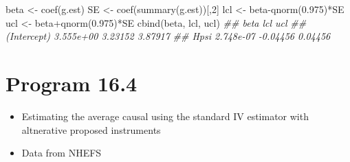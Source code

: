 \documentclass[
  10pt,
  a4paper,
]{book}
\newenvironment{Shaded}{\begin{snugshade}}{\end{snugshade}}
\newcommand{\DecValTok}[1]{\textcolor[rgb]{0.68,0.00,0.00}{#1}}
\newcommand{\DocumentationTok}[1]{\textcolor[rgb]{0.37,0.37,0.37}{\textit{#1}}}
\newcommand{\FloatTok}[1]{\textcolor[rgb]{0.68,0.00,0.00}{#1}}
\newcommand{\FunctionTok}[1]{\textcolor[rgb]{0.28,0.35,0.67}{#1}}
\newcommand{\NormalTok}[1]{\textcolor[rgb]{0.00,0.46,0.62}{#1}}
\newcommand{\OtherTok}[1]{\textcolor[rgb]{0.00,0.46,0.62}{#1}}
\newcommand{\SpecialCharTok}[1]{\textcolor[rgb]{0.37,0.37,0.37}{#1}}
\providecommand{\tightlist}{%
  \setlength{\itemsep}{0pt}\setlength{\parskip}{0pt}}
\begin{document}
\begin{Shaded}
\begin{Highlighting}[]
\NormalTok{beta }\OtherTok{\textless{}{-}} \FunctionTok{coef}\NormalTok{(g.est)}
\NormalTok{SE }\OtherTok{\textless{}{-}} \FunctionTok{coef}\NormalTok{(}\FunctionTok{summary}\NormalTok{(g.est))[,}\DecValTok{2}\NormalTok{]}
\NormalTok{lcl }\OtherTok{\textless{}{-}}\NormalTok{ beta}\SpecialCharTok{{-}}\FunctionTok{qnorm}\NormalTok{(}\FloatTok{0.975}\NormalTok{)}\SpecialCharTok{*}\NormalTok{SE }
\NormalTok{ucl }\OtherTok{\textless{}{-}}\NormalTok{ beta}\SpecialCharTok{+}\FunctionTok{qnorm}\NormalTok{(}\FloatTok{0.975}\NormalTok{)}\SpecialCharTok{*}\NormalTok{SE}
\FunctionTok{cbind}\NormalTok{(beta, lcl, ucl)}
\DocumentationTok{\#\#                  beta      lcl     ucl}
\DocumentationTok{\#\# (Intercept) 3.555e+00  3.23152 3.87917}
\DocumentationTok{\#\# Hpsi        2.748e{-}07 {-}0.04456 0.04456}
\end{Highlighting}
\end{Shaded}

\hypertarget{program-16.4}{%
\section{Program 16.4}\label{program-16.4}}

\begin{itemize}
\tightlist
\item
  Estimating the average causal using the standard IV estimator with altnerative proposed instruments
\item
  Data from NHEFS
\end{itemize}
\end{document}
